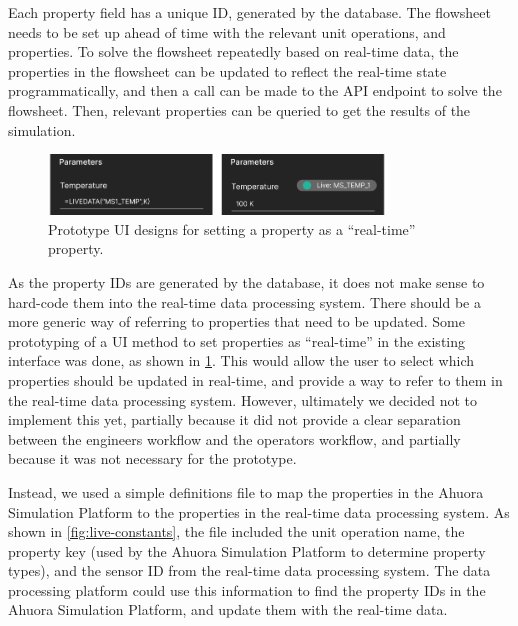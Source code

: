 \documentclass[12pt]{report}
\begin{document}

Each property field has a unique ID, generated by the database. The flowsheet needs to be set up ahead of time with the relevant unit operations, and properties. To solve the flowsheet repeatedly based on real-time data, the properties in the flowsheet can be updated to reflect the real-time state programmatically, and then a call can be made to the API endpoint to solve the flowsheet. Then, relevant properties can be queried to get the results of the simulation.

\begin{figure}
    \centering
    \includegraphics[width=0.8\textwidth]{property_ui.png}
    \caption{Prototype UI designs for setting a property as a ``real-time'' property.}
    \label{fig:property-ui}
\end{figure}

As the property IDs are generated by the database, it does not make sense to hard-code them into the real-time data processing system. There should be a more generic way of referring to properties that need to be updated. Some prototyping of a UI method to set properties as ``real-time'' in the existing interface was done, as shown in \cref{fig:property-ui}. This would allow the user to select which properties should be updated in real-time, and provide a way to refer to them in the real-time data processing system. However, ultimately we decided not to implement this yet, partially because it did not provide a clear separation between the engineers workflow and the operators workflow, and partially because it was not necessary for the prototype.

Instead, we used a simple definitions file to map the properties in the Ahuora Simulation Platform to the properties in the real-time data processing system. As shown in \cref{fig:live-constants}, the file included the unit operation name, the property key (used by the Ahuora Simulation Platform to determine property types), and the sensor ID from the real-time data processing system. The data processing platform could use this information to find the property IDs in the Ahuora Simulation Platform, and update them with the real-time data.
\end{document}
